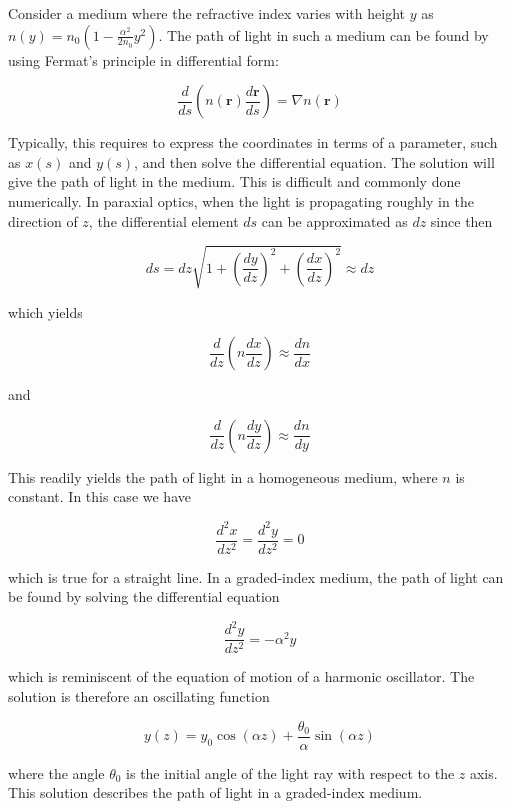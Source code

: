 \documentclass[
  a4paper,
]{book}
\begin{document}
\begin{tcolorbox}[enhanced jigsaw, coltitle=black, title=\textcolor{quarto-callout-tip-color}{\faLightbulb}\hspace{0.5em}{Example: Light in a Graded-Index Medium}, colframe=quarto-callout-tip-color-frame, toprule=.15mm, opacitybacktitle=0.6, left=2mm, opacityback=0, breakable, toptitle=1mm, bottomtitle=1mm, leftrule=.75mm, arc=.35mm, titlerule=0mm, colbacktitle=quarto-callout-tip-color!10!white, rightrule=.15mm, bottomrule=.15mm, colback=white]

Consider a medium where the refractive index varies with height \(y\) as
\(n(y) = n_0 (1 - \frac{\alpha^2}{2 n_0} y^2)\). The path of light in
such a medium can be found by using Fermat's principle in differential
form:

\[
\frac{d}{ds}\left (n(\textbf{r})\frac{d\textbf{r}}{ds}\right)=\nabla n(\textbf{r})
\]

Typically, this requires to express the coordinates in terms of a
parameter, such as \(x(s)\) and \(y(s)\), and then solve the
differential equation. The solution will give the path of light in the
medium. This is difficult and commonly done numerically. In paraxial
optics, when the light is propagating roughly in the direction of \(z\),
the differential element \(ds\) can be approximated as \(dz\) since then

\[
ds=dz\sqrt{1+\left (\frac{dy}{dz}\right )^2+\left (\frac{dx}{dz}\right)^2}\approx dz
\]

which yields

\[
\frac{d}{dz}\left (n\frac{dx}{dz}\right)\approx \frac{dn}{dx}
\]

and

\[
\frac{d}{dz}\left (n\frac{dy}{dz}\right )\approx \frac{dn}{dy}
\]

This readily yields the path of light in a homogeneous medium, where
\(n\) is constant. In this case we have

\[
\frac{d^2 x}{dz^2}=\frac{d^2 y}{dz^2}=0
\]

which is true for a straight line. In a graded-index medium, the path of
light can be found by solving the differential equation

\[
\frac{d^2 y}{dz^2}=-\alpha^2 y
\]

which is reminiscent of the equation of motion of a harmonic oscillator.
The solution is therefore an oscillating function

\[
y(z)=y_0\cos(\alpha z)+\frac{\theta_0}{\alpha}\sin(\alpha z  )
\]

where the angle \(\theta_0\) is the initial angle of the light ray with
respect to the \(z\) axis. This solution describes the path of light in
a graded-index medium.

\end{tcolorbox}
\end{document}
